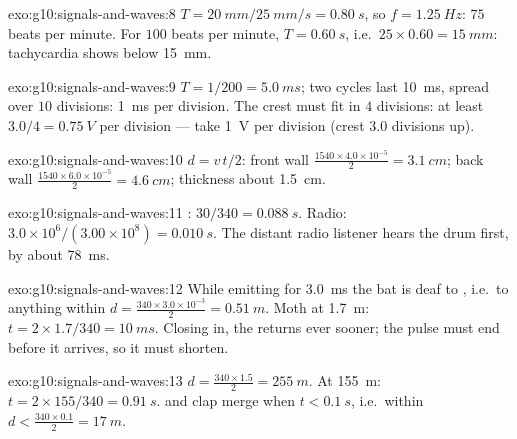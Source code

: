 \begin{solution}{exo:g10:signals-and-waves:8}
$T = \qty{20}{mm}/\qty{25}{mm/s} = \qty{0.80}{s}$, so
$f = \qty{1.25}{Hz}$: $75$ beats per minute. For $100$ beats per minute,
$T = \qty{0.60}{s}$, i.e.\ $25 \times 0.60 = \qty{15}{mm}$: tachycardia
shows below \qty{15}{mm}.
\end{solution}

\begin{solution}{exo:g10:signals-and-waves:9}
$T = 1/200 = \qty{5.0}{ms}$; two cycles last \qty{10}{ms}, spread over
$10$ divisions:  \qty{1}{ms} per division. The crest must fit
in $4$ divisions:  at least $3.0/4 = \qty{0.75}{V}$ per division ---
take \qty{1}{V} per division (crest $3.0$ divisions up).
\end{solution}

\begin{solution}{exo:g10:signals-and-waves:10}
$d = v\,t/2$: front wall
$\frac{1540 \times 4.0\times10^{-5}}{2} = \qty{3.1}{cm}$; back wall
$\frac{1540 \times 6.0\times10^{-5}}{2} = \qty{4.6}{cm}$; thickness
about \qty{1.5}{cm}.
\end{solution}

\begin{solution}{exo:g10:signals-and-waves:11}
: $30/340 = \qty{0.088}{s}$. Radio:
$3.0\times10^{6}/(3.00\times10^{8}) = \qty{0.010}{s}$. The distant radio
listener hears the drum first, by about \qty{78}{ms}.
\end{solution}

\begin{solution}{exo:g10:signals-and-waves:12}
While emitting for \qty{3.0}{ms} the bat is deaf to , i.e.\ to
anything within $d = \frac{340 \times 3.0\times10^{-3}}{2} =
\qty{0.51}{m}$. Moth at \qty{1.7}{m}:
$t = 2 \times 1.7/340 = \qty{10}{ms}$. Closing in, the  returns ever
sooner; the pulse must end before it arrives, so it must shorten.
\end{solution}

\begin{solution}{exo:g10:signals-and-waves:13}
$d = \frac{340 \times 1.5}{2} = \qty{255}{m}$. At \qty{155}{m}:
$t = 2 \times 155/340 = \qty{0.91}{s}$.  and clap merge when
$t < \qty{0.1}{s}$, i.e.\ within
$d < \frac{340 \times 0.1}{2} = \qty{17}{m}$.
\end{solution}

